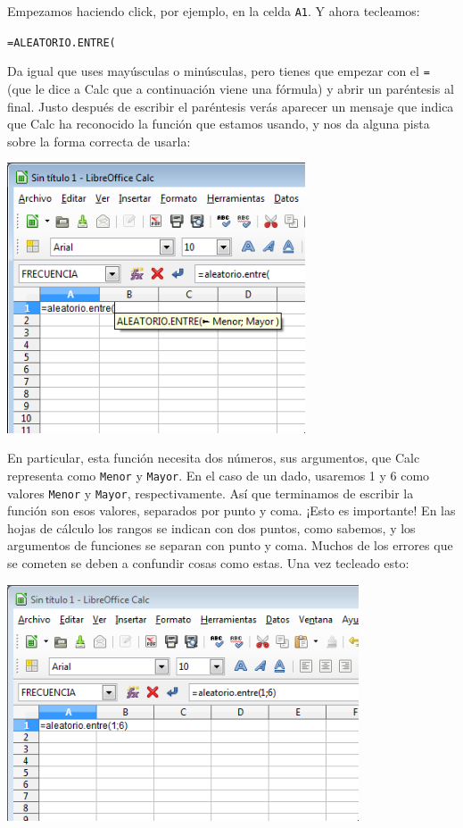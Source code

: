 \documentclass[10pt,a4paper]{article}\usepackage[]{graphicx}\usepackage[]{color}
\newcounter {cont01}
\begin{document}
Empezamos haciendo click, por ejemplo, en la celda {\tt A1}. Y ahora tecleamos:
\begin{center}
{\tt =ALEATORIO.ENTRE(}
\end{center}
Da igual que uses mayúsculas o minúsculas, pero tienes que empezar con el {\tt =} (que le dice a Calc que a continuación viene una fórmula) y abrir un paréntesis al final. Justo después de escribir el paréntesis verás aparecer un mensaje que indica que Calc ha reconocido la función que estamos usando, y nos da alguna pista sobre la forma correcta de usarla:
    \begin{center}
    \includegraphics[height=8cm]{../fig/Tut01-Calc-Formula-09.png}
    \end{center}
En particular, esta función necesita dos números, sus {\sf argumentos}, que Calc representa como {\tt Menor} y {\tt Mayor}. En el caso de un dado, usaremos 1 y 6 como valores {\tt Menor} y {\tt Mayor}, respectivamente. Así que terminamos de escribir la función  son esos valores, separados por punto y coma. ¡Esto es importante! En las hojas de cálculo los rangos se indican con dos puntos, como sabemos, y los argumentos de funciones se separan con punto y coma. Muchos de los errores que se cometen se deben a confundir cosas como estas. Una vez tecleado esto:
    \begin{center}
    \includegraphics[height=7cm]{../fig/Tut01-Calc-Formula-10.png}
    \end{center}
\end{document}
